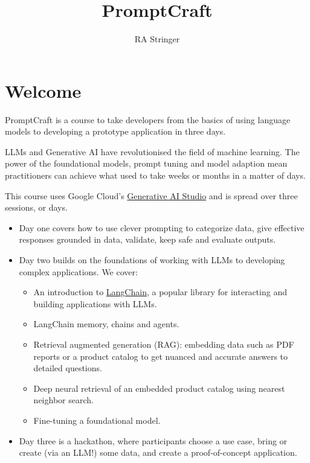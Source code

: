 \documentclass[
  letterpaper,
  DIV=11,
  numbers=noendperiod]{scrreprt}
\title{PromptCraft}
\author{RA Stringer}
\date{}
\providecommand{\tightlist}{%
  \setlength{\itemsep}{0pt}\setlength{\parskip}{0pt}}\usepackage{longtable,booktabs,array}
\renewcommand*\contentsname{Table of contents}
\newcommand\contentsname{Table of contents}
\begin{document}
\maketitle
\ifdefined\Shaded\renewenvironment{Shaded}{\begin{tcolorbox}[frame hidden, interior hidden, enhanced, borderline west={3pt}{0pt}{shadecolor}, breakable, sharp corners, boxrule=0pt]}{\end{tcolorbox}}\fi

\renewcommand*\contentsname{Table of contents}
{
\hypersetup{linkcolor=}
\setcounter{tocdepth}{2}
\tableofcontents
}

\hypertarget{welcome}{%
\chapter*{Welcome}\label{welcome}}


PromptCraft is a course to take developers from the basics of using
language models to developing a prototype application in three days.

LLMs and Generative AI have revolutionised the field of machine
learning. The power of the foundational models, prompt tuning and model
adaption mean practitioners can achieve what used to take weeks or
months in a matter of days.

This course uses Google Cloud's
\href{https://cloud.google.com/ai/generative-ai}{Generative AI Studio}
and is spread over three sessions, or days.

\begin{itemize}
\item
  Day one covers how to use clever prompting to categorize data, give
  effective responses grounded in data, validate, keep safe and evaluate
  outputs.
\item
  Day two builds on the foundations of working with LLMs to developing
  complex applications. We cover:

  \begin{itemize}
  \tightlist
  \item
    An introduction to
    \href{https://python.langchain.com/docs/get_started/introduction.html}{LangChain},
    a popular library for interacting and building applications with
    LLMs.
  \item
    LangChain memory, chains and agents.
  \item
    Retrieval augmented generation (RAG): embedding data such as PDF
    reports or a product catalog to get nuanced and accurate answers to
    detailed questions.
  \item
    Deep neural retrieval of an embedded product catalog using nearest
    neighbor search.
  \item
    Fine-tuning a foundational model.
  \end{itemize}
\item
  Day three is a hackathon, where participants choose a use case, bring
  or create (via an LLM!) some data, and create a proof-of-concept
  application.
\end{itemize}
\end{document}

